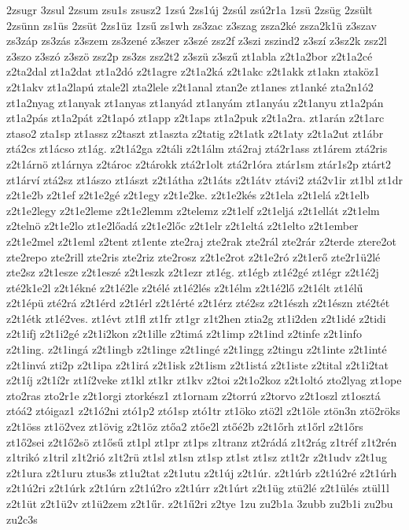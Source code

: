{2zsugr
3zsul
2zsum
zsu1s
zsusz2
1zsú
2zs1új
2zsúl
zsú2r1a
1zsü
2zsüg
2zsült
2zsünn
zs1üs
2zsüt
2zs1üz
1zsű
zs1wh
zs3zac
z3szag
zsza2ké
zsza2k1ü
z3szav
zs3záp
zs3zás
z3szem
zs3zené
z3szer
z3szé
zsz2f
z3szi
zszind2
z3szí
z3sz2k
zsz2l
z3szo
z3szó
z3szö
zsz2p
zs3zs
zsz2t2
z3szü
z3szű
zt1abla
z2t1a2bor
z2t1a2cé
z2ta2dal
zt1a2dat
zt1a2dó
z2t1agre
z2t1a2ká
z2t1akc
z2t1akk
zt1akn
ztaköz1
z2t1akv
zt1a2lapú
ztale2l
zta2lele
z2t1anal
ztan2e
zt1anes
zt1anké
zta2n1ó2
zt1a2nyag
zt1anyak
zt1anyas
zt1anyád
zt1anyám
zt1anyáu
z2t1anyu
zt1a2pán
zt1a2pás
zt1a2pát
z2t1apó
zt1app
z2t1aps
zt1a2puk
z2t1a2ra.
zt1arán
z2t1arc
ztaso2
zta1sp
zt1assz
z2taszt
zt1aszta
z2tatig
z2t1atk
z2t1aty
z2t1a2ut
zt1ábr
ztá2cs
zt1ácso
zt1ág.
z2t1á2ga
z2táli
z2t1álm
ztá2raj
ztá2r1ass
zt1árem
ztá2ris
z2t1árnö
zt1árnya
z2tároc
z2tárokk
ztá2r1olt
ztá2r1óra
ztár1sm
ztár1s2p
ztárt2
zt1árví
ztá2sz
zt1ászo
zt1ászt
z2t1átha
z2t1áts
z2t1átv
ztávi2
ztá2v1ir
zt1bl
zt1dr
z2t1e2b
z2t1ef
z2t1e2gé
z2t1egy
z2t1e2ke.
z2t1e2kés
z2t1ela
z2t1elá
z2t1elb
z2t1e2legy
z2t1e2leme
z2t1e2lemm
z2telemz
z2t1elf
z2t1eljá
z2t1ellát
z2t1elm
z2telnö
z2t1e2lo
zt1e2lőadá
z2t1e2lőc
z2t1elr
z2t1eltá
z2t1elto
z2t1ember
z2t1e2mel
z2t1eml
z2tent
zt1ente
zte2raj
zte2rak
zte2rál
zte2rár
z2terde
ztere2ot
zte2repo
zte2rill
zte2ris
zte2riz
zte2rosz
z2t1e2rot
z2t1e2ró
z2t1erő
zte2r1ü2lé
zte2sz
z2t1esze
z2t1eszé
z2t1eszk
z2t1ezr
zt1ég.
zt1égb
zt1é2gé
zt1égr
z2t1é2j
zté2k1e2l
z2t1ékné
z2t1é2le
z2télé
zt1é2lés
z2t1élm
z2t1é2lő
z2t1élt
zt1élű
z2t1épü
zté2rá
z2t1érd
z2t1érl
z2t1érté
z2t1érz
zté2sz
z2t1észh
z2t1észn
zté2tét
z2t1étk
zt1é2ves.
zt1évt
zt1fl
zt1fr
zt1gr
z1t2hen
ztia2g
zt1i2den
z2t1idé
z2tidi
z2t1ifj
z2t1i2gé
z2t1i2kon
z2t1ille
z2timá
z2t1imp
z2t1ind
z2tinfe
z2t1info
z2t1ing.
z2t1ingá
z2t1ingb
z2t1inge
z2t1ingé
z2t1ingg
z2tingu
z2t1inte
z2t1inté
z2t1invá
zti2p
z2t1ipa
z2t1irá
z2t1isk
z2t1ism
z2t1istá
z2t1iste
z2tital
z2t1i2tat
z2t1íj
z2t1í2r
zt1í2veke
zt1kl
zt1kr
zt1kv
z2toi
z2t1o2koz
z2t1oltó
zto2lyag
zt1ope
zto2ras
zto2r1e
z2t1orgi
ztorkész1
zt1ornam
z2torrú
z2torvo
z2t1oszl
zt1osztá
ztóá2
ztóigaz1
z2t1ó2ni
ztó1p2
ztó1sp
ztó1tr
zt1öko
ztö2l
z2t1öle
ztön3n
ztö2röks
z2t1öss
zt1ö2vez
zt1övig
z2t1öz
ztőa2
ztőe2l
ztőé2b
z2t1őrh
zt1őrl
z2t1őrs
zt1ő2sei
z2t1ő2sö
zt1ősű
zt1pl
zt1pr
zt1ps
z1tranz
zt2rádá
z1t2rág
z1tréf
z1t2rén
z1trikó
z1tril
z1t2rió
z1t2rü
zt1sl
zt1sn
zt1sp
zt1st
zt1sz
zt1t2r
z2t1udv
z2t1ug
z2t1ura
z2t1uru
ztus3s
zt1u2tat
z2t1utu
z2t1új
z2t1úr.
z2t1úrb
z2t1ú2ré
z2t1úrh
z2t1ú2ri
z2t1úrk
z2t1úrn
z2t1ú2ro
z2t1úrr
z2t1úrt
z2t1üg
ztü2lé
z2t1ülés
ztül1l
z2t1üt
z2t1ü2v
zt1ü2zem
z2t1űr.
z2t1ű2ri
z2tye
1zu
zu2b1a
3zubb
zu2b1i
zu2bu
zu2c3s
}
